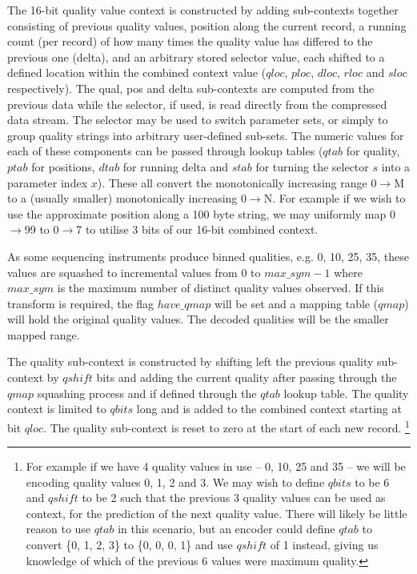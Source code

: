 \documentclass[a4paper]{article}
\begin{document}
The 16-bit quality value context is constructed by adding sub-contexts
together consisting of previous quality values, position along the
current record, a running count (per record) of how many times the
quality value has differed to the previous one (delta), and an
arbitrary stored selector value, each shifted to a defined location
within the combined context value ($qloc$, $ploc$, $dloc$, $rloc$ and
$sloc$ respectively).  The qual, pos and delta sub-contexts are
computed from the previous data while the selector, if used, is read
directly from the compressed data stream.  The selector may be used to
switch parameter sets, or simply to group quality strings into
arbitrary user-defined sub-sets.  The numeric values for each of these
components can be passed through lookup tables ($qtab$ for quality,
$ptab$ for positions, $dtab$ for running delta and $stab$ for turning
the selector $s$ into a parameter index $x$).  These all convert the
monotonically increasing range 0$\rightarrow$M to a (usually smaller)
monotonically increasing 0$\rightarrow$N.  For example if we wish to
use the approximate position along a 100 byte string, we may uniformly
map 0$\rightarrow$99 to 0$\rightarrow$7 to utilise 3 bits of our
16-bit combined context.

As some sequencing instruments produce binned qualities, e.g. 0, 10, 25,
35, these values are squashed to incremental values from 0 to
$max\_sym-1$ where $max\_sym$ is the maximum number of distinct
quality values observed.  If this transform is required, the flag
$have\_qmap$ will be set and a mapping table ($qmap$) will hold the
original quality values.  The decoded qualities will be the smaller
mapped range.

The quality sub-context is constructed by shifting left the previous
quality sub-context by $qshift$ bits and adding the current quality
after passing through the $qmap$ squashing process and if defined
through the $qtab$ lookup table.  The quality context is limited to
$qbits$ long and is added to the combined context starting at bit
$qloc$.  The quality sub-context is reset to zero at the start of each
new record.
\footnote{For example if we have 4 quality values in use -- 0, 10, 25 and
35 -- we will be encoding quality values 0, 1, 2 and 3.  We may wish to
define $qbits$ to be 6 and $qshift$ to be 2 such that the previous 3
quality values can be used as context, for the prediction of the next
quality value.  There will likely be little reason to use $qtab$ in
this scenario, but an encoder could define $qtab$ to convert \{0, 1, 2, 3\}
to \{0, 0, 0, 1\} and use $qshift$ of 1 instead, giving us
knowledge of which of the previous 6 values were maximum quality.}
\end{document}
